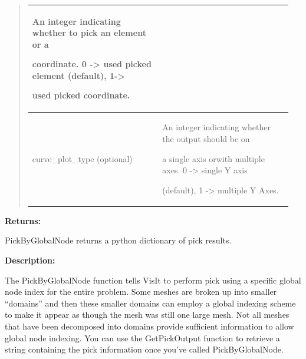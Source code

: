 \documentclass[letterpaper,10pt,english]{sphinxmanual}
\begin{document}
\begin{quote}
\begin{tabular}{|p{0.475\linewidth}|p{0.475\linewidth}|}
\begin{DUlineblock}{0em}
\item[] An integer indicating whether to pick an element or a
\item[] coordinate. 0 -\textgreater{} used picked element (default), 1-\textgreater{}
\item[] used picked coordinate.
\end{DUlineblock}
\\
\hline
curve\_plot\_type (optional)
 & 
\begin{DUlineblock}{0em}
\item[] An integer indicating whether the output should be on
\item[] a single axis orwith multiple axes. 0 -\textgreater{} single Y axis
\item[] (default), 1 -\textgreater{} multiple Y Axes.
\end{DUlineblock}
\\
\hline\end{tabular}

\end{quote}

\begin{DUlineblock}{0em}
\item[] 
\item[] \textbf{Returns:}
\item[] PickByGlobalNode returns a python dictionary of pick results.
\item[] 
\item[] \textbf{Description:}
\item[] The PickByGlobalNode function tells VisIt to perform pick using a specific
global node index for the entire problem. Some meshes are broken up into
smaller ``domains'' and then these smaller domains can employ a global
indexing scheme to make it appear as though the mesh was still one large
mesh. Not all meshes that have been decomposed into domains provide
sufficient information to allow global node indexing. You can use the
GetPickOutput function to retrieve a string containing the pick information
once you've called PickByGlobalNode.
\end{DUlineblock}

\begin{DUlineblock}{0em}
\item[] 
\end{DUlineblock}
\end{document}
